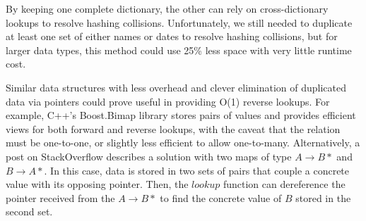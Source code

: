\documentclass{article}
\begin{document}
By keeping one complete dictionary, the other can rely on cross-dictionary lookups to resolve hashing collisions. Unfortunately, we still needed to duplicate at least one set of either names or dates to resolve hashing collisions, but for larger data types, this method could use 25\% less space with very little runtime cost.

Similar data structures with less overhead and clever elimination of duplicated data via pointers could prove useful in providing O(1) reverse lookups. For example, C++'s Boost.Bimap library \cite{boostBimap1, boostBimap2} stores pairs of values and provides efficient views for both forward and reverse lookups, with the caveat that the relation must be one-to-one, or slightly less efficient to allow one-to-many. Alternatively, a post on StackOverflow \cite{bimapStackOverflow} describes a solution with two maps of type $A \rightarrow B*$ and $B \rightarrow A*$. In this case, data is stored in two sets of pairs that couple a concrete value with its opposing pointer. Then, the $lookup$ function can dereference the pointer received from the $A \rightarrow B*$ to find the concrete value of $B$ stored in the second set.







\end{document}
